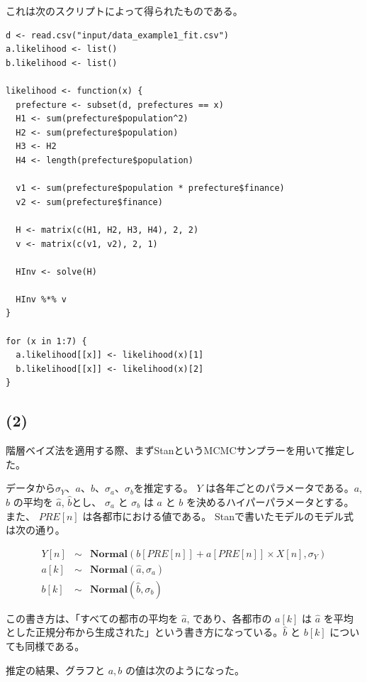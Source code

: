 \documentclass[a4j,xelatex,ja=standard,jafont=hiragino-pron, 10pt]{bxjsarticle}
\begin{document}
これは次のスクリプトによって得られたものである。

\begin{lstlisting}
d <- read.csv("input/data_example1_fit.csv")
a.likelihood <- list()
b.likelihood <- list()

likelihood <- function(x) {
  prefecture <- subset(d, prefectures == x)
  H1 <- sum(prefecture$population^2)
  H2 <- sum(prefecture$population)
  H3 <- H2
  H4 <- length(prefecture$population)

  v1 <- sum(prefecture$population * prefecture$finance)
  v2 <- sum(prefecture$finance)

  H <- matrix(c(H1, H2, H3, H4), 2, 2)
  v <- matrix(c(v1, v2), 2, 1)

  HInv <- solve(H)

  HInv %*% v
}

for (x in 1:7) {
  a.likelihood[[x]] <- likelihood(x)[1]
  b.likelihood[[x]] <- likelihood(x)[2]
}
\end{lstlisting}

\subsection*{(2)}

階層ベイズ法を適用する際、まずStanというMCMCサンプラーを用いて推定した。

データから\(\sigma_Y\)、\(a\)、\(b\)、\(\sigma_a\)、\(\sigma_b\)を推定する。
\(Y\) は各年ごとのパラメータである。\(a\), \(b\) の平均を \(\hat{a}\),
\(\hat{b}\)とし、 \(\sigma_a\) と \(\sigma_b\) は \(a\) と \(b\)
を決めるハイパーパラメータとする。また、 \(PRE[n]\)
は各都市における値である。 Stanで書いたモデルのモデル式は次の通り。

\begin{eqnarray}
  Y[n] &\sim& \textbf{Normal}(b[PRE[n]] + a[PRE[n]] \times X[n], \sigma_Y) \\
  a[k] &\sim& \textbf{Normal}(\hat{a}, \sigma_a) \\
  b[k] &\sim& \textbf{Normal}(\hat{b}, \sigma_b)
\end{eqnarray}

この書き方は、「すべての都市の平均を \(\hat{a}\), であり、各都市の
\(a[k]\) は \(\hat{a}\)
を平均とした正規分布から生成された」という書き方になっている。\(\hat{b}\)
と \(b[k]\) についても同様である。

推定の結果、グラフと $a, b$ の値は次のようになった。
\end{document}
